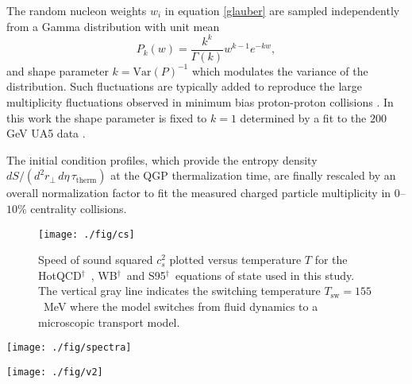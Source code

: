 \documentclass[aps,prc,reprint,amsmath,nofootinbib,superscriptaddress]{revtex4-1}
\newcommand{\hotqcd}{HotQCD$^\dagger$~}
\newcommand{\wb}{WB$^\dagger$~}
\newcommand{\spv}{S95$^\dagger$~}
\begin{document}
The random nucleon weights $w_i$ in equation \eqref{glauber} are sampled independently from a Gamma distribution with unit mean
\begin{equation}
 P_k(w) = \frac{k^k}{\Gamma(k)} w^{k-1} e^{-k w},
\end{equation}
and shape parameter $k = \text{Var}(P)^{-1}$ which modulates the variance of the distribution. 
Such fluctuations are typically added to reproduce the large multiplicity fluctuations observed in minimum bias proton-proton collisions \cite{Adare:2008ns, Dumitru:2012yr, Moreland:2012qw, Bozek:2013uha, Shen:2014sfi}. 
In this work the shape parameter is fixed to $k=1$ determined by a fit to the $200$ GeV UA5 data \cite{Ansorge:1988kn}. 

The initial condition profiles, which provide the entropy density $dS/(d^2r_\perp\, d\eta\, \tau_\text{therm})$ at the QGP thermalization time, are finally 
rescaled by an overall normalization factor to fit the measured charged particle multiplicity in $0$--$10\%$ centrality collisions.

\begin{figure}
  \texttt{[image: ./fig/cs]}
  \caption{\label{fig:cs} Speed of sound squared $c_s^2$ plotted versus temperature $T$ for the \hotqcd, \wb and \spv equations of state used in this study. The vertical
	   gray line indicates the switching temperature $T_\text{sw} = 155$~MeV where the model switches from fluid dynamics to a microscopic transport model.}
\end{figure}

\begin{figure*}[t]
  \texttt{[image: ./fig/spectra]}
  \caption{
    \label{fig:spectra} Effect of the equation of state on transverse momentum spectra. Top row: model calculations using the \hotqcd equation of state plotted against 
    PHENIX data for pions, kaons and protons (blue lines/circles, red lines/squares and green lines/triangles) in centrality bins $0$--$5\%$, $20$--$30\%$ and $40$--$50\%$ 
    (columns left to right). Middle and bottom rows: ratios of the \wb and \spv invariant yields to the \hotqcd result. Shaded bands indicate two sigma statistical error. }
\end{figure*}

\begin{figure*}[t]
  \texttt{[image: ./fig/v2]}
  \caption{
    \label{fig:v2} Effect of the equation of state on differential elliptic flow $v_2(p_T)$ calculated from the Cooper-Frye freezeout hypersurface \eqref{differential_flow}.
    Top row: model calculations using the \hotqcd equation of state for the elliptic flow $v_2(p_T)$  of pions, kaons and protons (blue, orange and green lines) 
    in centrality bins $0$--$10\%$, $20$--$30\%$ and $40$--$50\%$ (columns left to right). Middle and bottom rows: ratios of the \wb and \spv elliptic flow to 
    the \hotqcd result. Statistical errors are smaller than the linewidth and have been omitted.
  }
\end{figure*}
\end{document}

